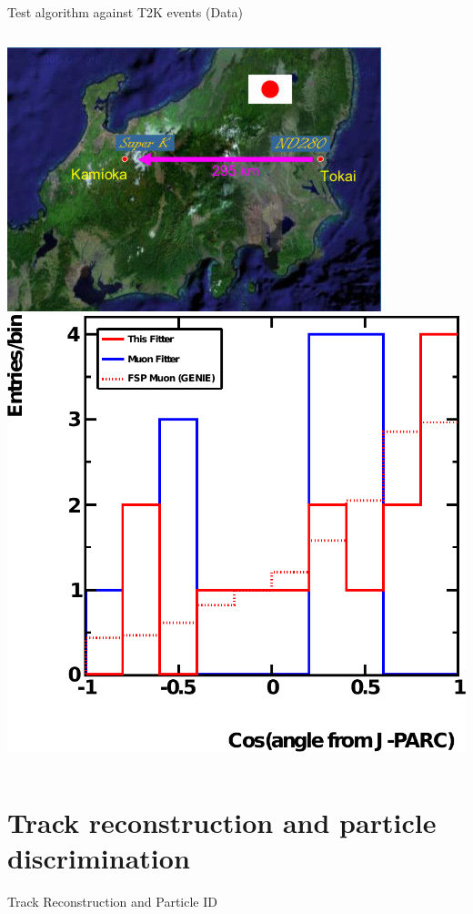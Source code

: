 \documentclass[14pt]{beamer}
\begin{document}
\begin{frame}{Test algorithm against T2K events (Data)}
	\begin{columns}[T]
		\includegraphics[width=\linewidth]{t2k.jpeg}
		\includegraphics[width=\linewidth]{analyzed_rtq_t2k_nu_t2kReconDir_hist.pdf}
	\end{columns}
\end{frame}

\section{Track reconstruction and particle discrimination}
\begin{frame}
	\centering
	Track Reconstruction and Particle ID
\end{frame}
\end{document}
